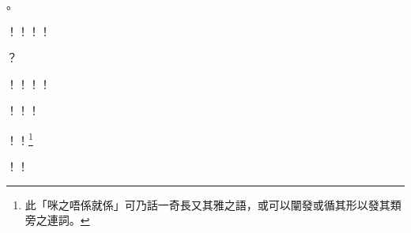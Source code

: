 \begin{dialogue}
。
\end{dialogue}
\begin{dialogue}
！！！！
\end{dialogue}
\begin{dialogue}
？
\end{dialogue}
\begin{dialogue}
！！！！
\end{dialogue}
\begin{dialogue}
！！！
\end{dialogue}
\begin{dialogue}
！！\footnote{此「咪之唔係就係」可乃話一奇長又其雅之語，或可以闡發或循其形以發其類旁之連詞。}
\end{dialogue}
\begin{dialogue}
！！
\end{dialogue}
